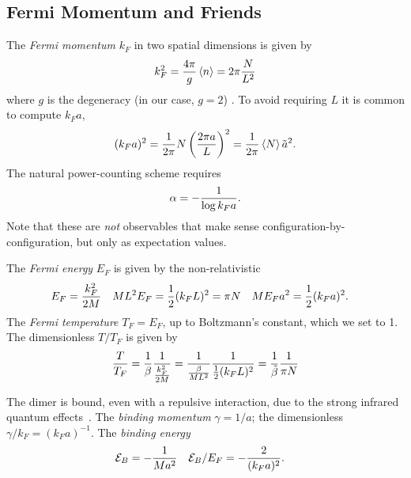 \subsection{Fermi Momentum and Friends}\label{sec:kF}

The \emph{Fermi momentum} $k_F$ in two spatial dimensions is given by
\begin{align}
    k_F^2 = \frac{4\pi}{g} \left\langle n \right\rangle = 2\pi \frac{N}{L^2}
    \label{eq:kF}
\end{align}
where $g$ is the degeneracy (in our case, $g=2$) \cite{Beane:2022wcn}.
To avoid requiring $L$ it is common to compute $k_F a$,
\begin{align}
    (k_F a)^2 = \frac{1}{2\pi} N \left(\frac{2\pi a}{L}\right)^2 = \frac{1}{2\pi} \left\langle N \right\rangle \tilde{a}^2.
    \label{eq:kF a}
\end{align}
The natural power-counting scheme requires\cite{Beane:2022wcn}
\begin{align}
    \alpha = - \frac{1}{\log k_F a}.
    \label{eq:alpha}
\end{align}
Note that these are \emph{not} observables that make sense configuration-by-configuration, but only as expectation values.

The \emph{Fermi energy} $E_F$ is given by the non-relativistic
\begin{align}
    E_F &= \frac{k_F^2}{2M}
    &
    ML^2 E_F &= \frac{1}{2} (k_F L)^2 = \pi N
    &
    ME_F a^2 &= \frac{1}{2} (k_F a)^2.
\end{align}
The \emph{Fermi temperature} $T_F=E_F$, up to Boltzmann's constant, which we set to 1.
The dimensionless $T/T_F$ is given by
\begin{align}
    \frac{T}{T_F} = \frac{1}{\beta}\frac{1}{\frac{k_F^2}{2M}} = \frac{1}{\frac{\beta}{ML^2}} \frac{1}{\frac{1}{2} (k_F L)^2} = \frac{1}{\tilde{\beta}} \frac{1}{\pi N}
    \label{eq:TF}
\end{align}

The dimer is bound, even with a repulsive interaction, due to the strong infrared quantum effects~\cite{Beane:2022wcn}.
The \emph{binding momentum} $\gamma=1/a$; the dimensionless $\gamma/k_F = (k_F a)^{-1}$.
The \emph{binding energy} \binding
\begin{align}
    \mathcal{E}_B &= - \frac{1}{Ma^2}
    &
    \mathcal{E}_B / E_F &= - \frac{2}{(k_F a)^2}.
    \label{eq:binding energy}
\end{align}
